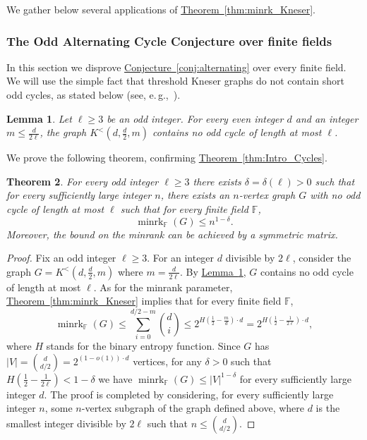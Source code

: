 \documentclass[11pt]{article}
\numberwithin{equation}{section}
\newtheorem{theorem}{Theorem}[section]
\newtheorem{lemma}[theorem]{Lemma}
\theoremstyle{definition}
\theoremstyle{plain}
\newcommand{\expref}[2]{\hyperref[#2]{#1~\ref{#2}}}
\newcommand{\Fset}{\mathbb{F}}
\newcommand{\minrank}{\mathop{\mathrm{minrk}}}
\newcommand\Kneser[3]{K^<(#1,#2,#3)}
\begin{document}
We gather below several applications of \expref{Theorem}{thm:minrk_Kneser}.

\subsubsection{The Odd Alternating Cycle Conjecture over finite fields}

%
In this section we disprove %
\expref{Conjecture}{conj:alternating} over every finite field.
We will use the simple fact that
%
threshold Kneser graphs   %
do not contain short odd cycles, as stated below (see, e.\,g.,~\cite{Denley97,Haviv18free}).

\begin{lemma}\label{lemma:cycle_K}
Let $\ell \geq 3$ be an odd integer.
For every even integer $d$ and an integer $m \leq \frac{d}{2\ell}$, the graph $\Kneser{d}{\frac{d}{2}}{m}$ contains no odd cycle of length at most $\ell$.
\end{lemma}

We prove the following theorem, confirming \expref{Theorem}{thm:Intro_Cycles}.

\begin{theorem}\label{thm:Cycles}
For every odd integer $\ell \geq 3$ there exists $\delta = \delta(\ell) >0$ such that for every sufficiently large integer $n$, there exists an $n$-vertex graph $G$ with no odd cycle of length at most $\ell$ such that for every finite field $\Fset$,
\[{\minrank}_{\Fset}(G) \leq n^{1-\delta}.\]
Moreover, the bound on the minrank can be achieved by a symmetric matrix.
\end{theorem}

\begin{proof}
Fix an odd integer $\ell \geq 3$.
For an integer $d$ divisible by $2 \ell$, consider the graph $G = \Kneser{d}{\frac{d}{2}}{m}$ where $m = \frac{d}{2 \ell}$.
By \expref{Lemma}{lemma:cycle_K}, $G$ contains no odd cycle of length at most $\ell$.
As for the minrank parameter, \expref{Theorem}{thm:minrk_Kneser} implies that for every finite field $\Fset$,
\[{\minrank}_{\Fset}(G) \leq \sum_{i=0}^{d/2-m}\binom{d}{i} \leq 2^{H(\frac{1}{2}-\frac{m}{d}) \cdot d} = 2^{H(\frac{1}{2}-\frac{1}{2\ell}) \cdot d},\]
where $H$ stands for the binary entropy function.
Since $G$ has $|V| = \binom{d}{d/2} = 2^{(1-o(1)) \cdot d}$ vertices, for any $\delta>0$ such that $H(\frac{1}{2}-\frac{1}{2\ell}) < 1-\delta$ we have ${\minrank}_{\Fset}(G) \leq |V|^{1-\delta}$ for every sufficiently large integer $d$.
The proof is completed by considering, for every sufficiently large integer $n$, some $n$-vertex subgraph of the graph defined above, where $d$ is the smallest integer divisible by $2\ell$ such that $n \leq \binom{d}{d/2}$.
\end{proof}
\end{document}
